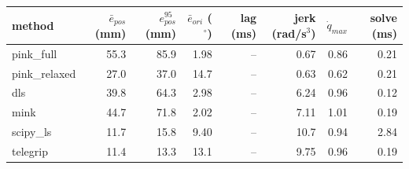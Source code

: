 \begin{tabular}{lrrrrrrr}
\toprule
method & $\bar{e}_{pos}$ (mm) & $e_{pos}^{95}$ (mm) & $\bar{e}_{ori}$ ($^\circ$) & lag (ms) & jerk (rad/s$^3$) & $\dot{q}_{max}$ & solve (ms) \\
\midrule
pink\_full & 55.3 & 85.9 & 1.98 & -- & 0.67 & 0.86 & 0.21 \\
pink\_relaxed & 27.0 & 37.0 & 14.7 & -- & 0.63 & 0.62 & 0.21 \\
dls & 39.8 & 64.3 & 2.98 & -- & 6.24 & 0.96 & 0.12 \\
mink & 44.7 & 71.8 & 2.02 & -- & 7.11 & 1.01 & 0.19 \\
scipy\_ls & 11.7 & 15.8 & 9.40 & -- & 10.7 & 0.94 & 2.84 \\
telegrip & 11.4 & 13.3 & 13.1 & -- & 9.75 & 0.96 & 0.19 \\
\bottomrule
\end{tabular}
